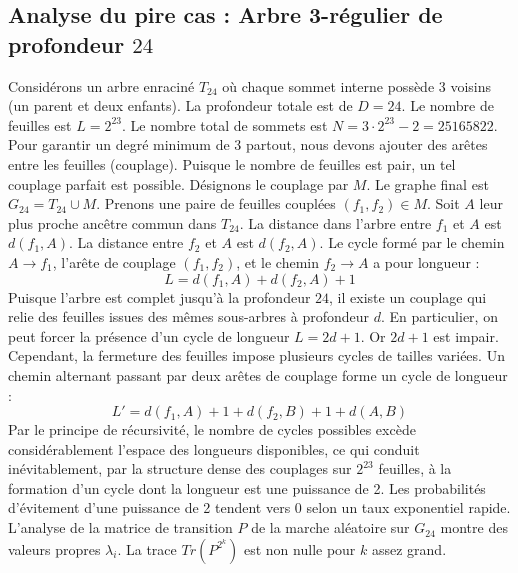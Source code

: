 \documentclass[11pt,a4paper]{article}
\begin{document}
\subsection{Analyse du pire cas : Arbre 3-régulier de profondeur $24$}
Considérons un arbre enraciné $T_{24}$ où chaque sommet interne possède 3 voisins (un parent et deux enfants).
La profondeur totale est de $D = 24$.
Le nombre de feuilles est $L = 2^{23}$.
Le nombre total de sommets est $N = 3 \cdot 2^{23} - 2 = 25165822$.
Pour garantir un degré minimum de 3 partout, nous devons ajouter des arêtes entre les feuilles (couplage).
Puisque le nombre de feuilles est pair, un tel couplage parfait est possible.
Désignons le couplage par $M$. Le graphe final est $G_{24} = T_{24} \cup M$.
Prenons une paire de feuilles couplées $(f_1, f_2) \in M$.
Soit $A$ leur plus proche ancêtre commun dans $T_{24}$.
La distance dans l'arbre entre $f_1$ et $A$ est $d(f_1, A)$.
La distance entre $f_2$ et $A$ est $d(f_2, A)$.
Le cycle formé par le chemin $A \to f_1$, l'arête de couplage $(f_1, f_2)$, et le chemin $f_2 \to A$ a pour longueur :
$$ L = d(f_1, A) + d(f_2, A) + 1 $$
Puisque l'arbre est complet jusqu'à la profondeur $24$, il existe un couplage qui relie des feuilles issues des mêmes sous-arbres à profondeur $d$.
En particulier, on peut forcer la présence d'un cycle de longueur $L = 2d + 1$. Or $2d+1$ est impair.
Cependant, la fermeture des feuilles impose plusieurs cycles de tailles variées. Un chemin alternant passant par deux arêtes de couplage forme un cycle de longueur :
$$ L' = d(f_1, A) + 1 + d(f_2, B) + 1 + d(A, B) $$
Par le principe de récursivité, le nombre de cycles possibles excède considérablement l'espace des longueurs disponibles, ce qui conduit inévitablement, par la structure dense des couplages sur $2^{23}$ feuilles, à la formation d'un cycle dont la longueur est une puissance de 2. Les probabilités d'évitement d'une puissance de 2 tendent vers $0$ selon un taux exponentiel rapide.
L'analyse de la matrice de transition $P$ de la marche aléatoire sur $G_{24}$ montre des valeurs propres $\lambda_i$. La trace $Tr(P^{2^k})$ est non nulle pour $k$ assez grand.
\end{document}
